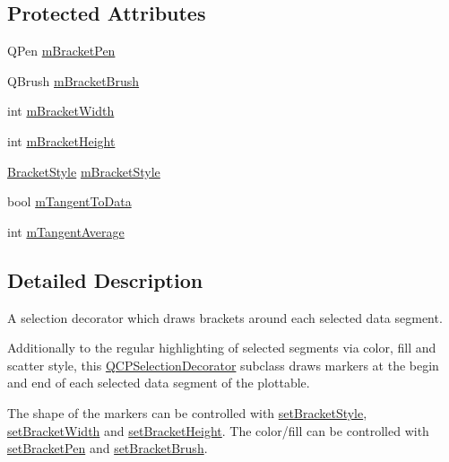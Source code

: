 \subsection*{Protected Attributes}
\begin{DoxyCompactItemize}
\item 
Q\+Pen \hyperlink{class_q_c_p_selection_decorator_bracket_ac7da5610713e67e92d0a882ef743a453}{m\+Bracket\+Pen}
\item 
Q\+Brush \hyperlink{class_q_c_p_selection_decorator_bracket_ae905dd458b85ac529fb9c6ec879e5680}{m\+Bracket\+Brush}
\item 
int \hyperlink{class_q_c_p_selection_decorator_bracket_a333983308322d10968c35bf2af4b392d}{m\+Bracket\+Width}
\item 
int \hyperlink{class_q_c_p_selection_decorator_bracket_a3887d29b82f4dec3bf2ddf97d5475b16}{m\+Bracket\+Height}
\item 
\hyperlink{class_q_c_p_selection_decorator_bracket_aa6d18517ec0553575bbef0de4252336e}{Bracket\+Style} \hyperlink{class_q_c_p_selection_decorator_bracket_a5ed4965200caa115da1a49f2f860e23c}{m\+Bracket\+Style}
\item 
bool \hyperlink{class_q_c_p_selection_decorator_bracket_ac08c7de0fd81b64b0f3fe31739688081}{m\+Tangent\+To\+Data}
\item 
int \hyperlink{class_q_c_p_selection_decorator_bracket_a810900616f17964cab140cbc13f40203}{m\+Tangent\+Average}
\end{DoxyCompactItemize}


\subsection{Detailed Description}
A selection decorator which draws brackets around each selected data segment. 

Additionally to the regular highlighting of selected segments via color, fill and scatter style, this \hyperlink{class_q_c_p_selection_decorator}{Q\+C\+P\+Selection\+Decorator} subclass draws markers at the begin and end of each selected data segment of the plottable.

The shape of the markers can be controlled with \hyperlink{class_q_c_p_selection_decorator_bracket_a04507697438f6ad8cc2aeea5422dcbe5}{set\+Bracket\+Style}, \hyperlink{class_q_c_p_selection_decorator_bracket_a291b59cab98ce93a0a3c85963fe10f5e}{set\+Bracket\+Width} and \hyperlink{class_q_c_p_selection_decorator_bracket_aed773ad737201cca40efc6fe451acad8}{set\+Bracket\+Height}. The color/fill can be controlled with \hyperlink{class_q_c_p_selection_decorator_bracket_ac0e392a6097990f8aa978932a8fa05d6}{set\+Bracket\+Pen} and \hyperlink{class_q_c_p_selection_decorator_bracket_a2f4ea0bfb0ea980252b76dd349dd53aa}{set\+Bracket\+Brush}.

